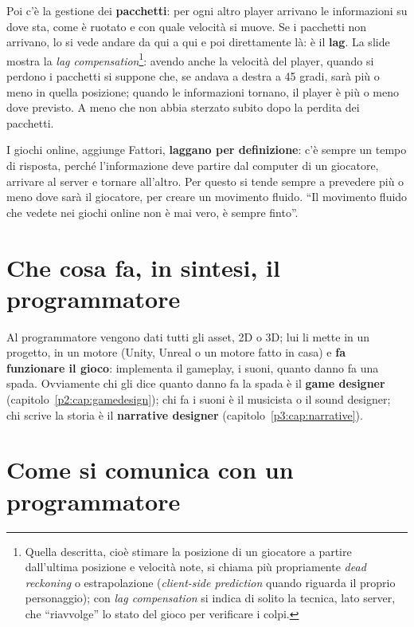 Poi c'è la gestione dei \textbf{pacchetti}: per ogni altro player arrivano le
informazioni su dove sta, come è ruotato e con quale velocità si muove. Se i
pacchetti non arrivano, lo si vede andare da qui a qui e poi direttamente là:
è il \textbf{lag}. La slide mostra la \emph{lag compensation}\footnote{Quella
descritta, cioè stimare la posizione di un giocatore a partire dall'ultima
posizione e velocità note, si chiama più propriamente \emph{dead reckoning}
o estrapolazione (\emph{client-side prediction} quando riguarda il proprio
personaggio); con \emph{lag compensation} si indica di solito la tecnica, lato
server, che ``riavvolge'' lo stato del gioco per verificare i colpi.}: avendo
anche la velocità del player, quando si perdono i pacchetti si suppone che,
se andava a destra a 45 gradi, sarà più o meno in quella posizione; quando le
informazioni tornano, il player è più o meno dove previsto. A meno che non
abbia sterzato subito dopo la perdita dei pacchetti.

I giochi online, aggiunge Fattori, \textbf{laggano per definizione}: c'è
sempre un tempo di risposta, perché l'informazione deve partire dal computer
di un giocatore, arrivare al server e tornare all'altro. Per questo si tende
sempre a prevedere più o meno dove sarà il giocatore, per creare un movimento
fluido. ``Il movimento fluido che vedete nei giochi online non è mai vero, è
sempre finto''.

\section{Che cosa fa, in sintesi, il programmatore}
\label{p5:sec:ruolo}

Al programmatore vengono dati tutti gli asset, 2D o 3D; lui li mette in un
progetto, in un motore (Unity, Unreal o un motore fatto in casa) e \textbf{fa
funzionare il gioco}: implementa il gameplay, i suoni, quanto danno fa una
spada. Ovviamente chi gli dice quanto danno fa la spada è il \textbf{game
designer} (capitolo~\ref{p2:cap:gamedesign}); chi fa i suoni è il musicista o
il sound designer; chi scrive la storia è il \textbf{narrative designer}
(capitolo~\ref{p3:cap:narrative}).

\section{Come si comunica con un programmatore}
\label{p5:sec:comunicare}

